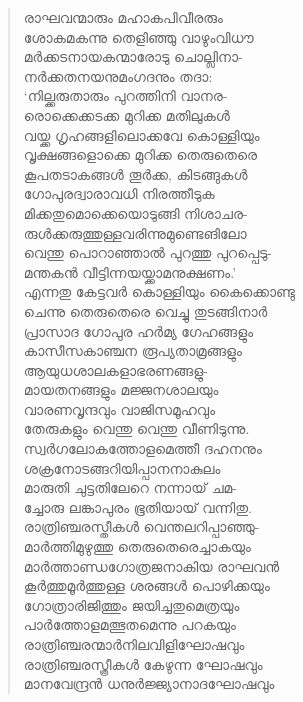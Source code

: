 \begin{verse}
രാഘവന്മാരും മഹാകപിവീരരും\\
ശോകമകന്നു തെളിഞ്ഞു വാഴുംവിധൗ\\
മര്‍ക്കടനായകന്മാരോടു ചൊല്ലിനാ-\\
നര്‍ക്കതനയനുമംഗദനും തദാ:\\
‘നില്ക്കരുതാരും പുറത്തിനി വാനര-\\
രൊക്കെക്കടക്ക മുറിക്ക മതിലുകള്‍\\
വയ്ക്ക ഗൃഹങ്ങളിലൊക്കവേ കൊള്ളിയും\\
വൃക്ഷങ്ങളൊക്കെ മുറിക്ക തെരുതെരെ\\
കൂപതടാകങ്ങള്‍ തൂര്‍ക്ക, കിടങ്ങുകള്‍\\
ഗോപുരദ്വാരാവധി നിരത്തീടുക\\
മിക്കതുമൊക്കെയൊടുങ്ങി നിശാചര-\\
രുള്‍ക്കരുത്തുള്ളവരിന്നുമുണ്ടെങിലോ\\
വെന്തു പൊറാഞ്ഞാല്‍ പുറത്തു പുറപ്പെടു-\\
മന്തകന്‍ വീട്ടിന്നയയ്ക്കാമനുക്ഷണം.’\\
എന്നതു കേട്ടവര്‍ കൊള്ളിയും കൈക്കൊണ്ടു\\
ചെന്നു തെരുതെരെ വെച്ചു തുടങ്ങിനാര്‍\\
പ്രാസാദ ഗോപുര ഹര്‍മ്യ ഗേഹങ്ങളും\\
കാസീസകാഞ്ചന രൂപ്യതാമ്രങ്ങളും\\
ആയുധശാലകളാഭരണങ്ങളു-\\
മായതനങ്ങളും മജ്ജനശാലയും\\
വാരണവൃന്ദവും വാജിസമൂഹവും\\
തേരുകളും വെന്തു വെന്തു വീണിടുന്നു.\\
സ്വര്‍ഗലോകത്തോളമെത്തീ ദഹനനും\\
ശക്രനോടങ്ങറിയിപ്പാനനാകുലം\\
മാരുതി ചുട്ടതിലേറെ നന്നായ് ചമ-\\
ച്ചോരു ലങ്കാപുരം ഭൂതിയായ് വന്നിതു.\\
രാത്രിഞ്ചരസ്തീകള്‍ വെന്തലറിപ്പാഞ്ഞു-\\
മാര്‍ത്തിമുഴുത്തു തെരുതെരെച്ചാകയും\\
മാര്‍ത്താണ്ഡഗോത്രജനാകിയ രാഘവന്‍\\
കൂര്‍ത്തുമൂര്‍ത്തുള്ള ശരങ്ങള്‍ പൊഴിക്കയും\\
ഗോത്രാരിജിത്തും ജയിച്ചതുമെത്രയും\\
പാര്‍ത്തോളമത്ഭുതമെന്നു പറകയും\\
രാത്രിഞ്ചരന്മാര്‍നിലവിളിഘോഷവും\\
രാത്രിഞ്ചരസ്ത്രീകള്‍ കേഴുന്ന ഘോഷവും\\
മാനവേന്ദ്രന്‍ ധനുര്‍ജ്ജ്യാനാദഘോഷവും\\

\end{verse}
